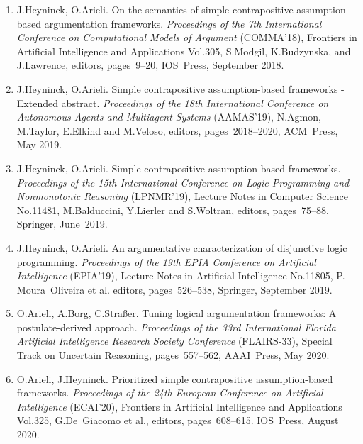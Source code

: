 \documentclass{article}
\begin{document}
\begin{enumerate}
  \item J.Heyninck, O.Arieli.
          On the semantics of simple contrapositive assumption-based argumentation frameworks.
          {\em Proceedings of the 7th International Conference on Computational Models of Argument\/} (COMMA'18),
          Frontiers in Artificial Intelligence and Applications Vol.305, S.Modgil, K.Budzynska, and J.Lawrence, editors,
          pages~9--20, IOS~Press, September 2018.

  \item J.Heyninck, O.Arieli.
          Simple contrapositive assumption-based frameworks - Extended abstract.
          {\em  Proceedings of the 18th International Conference on  Autonomous Agents and Multiagent Systems\/}
          (AAMAS'19), N.Agmon, M.Taylor, E.Elkind and M.Veloso, editors, pages~2018--2020, ACM~Press, May 2019.

  \item J.Heyninck, O.Arieli.
          Simple contrapositive assumption-based frameworks.
          {\em  Proceedings of the 15th International Conference on Logic Programming and Nonmonotonic Reasoning\/}
          (LPNMR'19), Lecture Notes in Computer Science No.11481, M.Balduccini, Y.Lierler and S.Woltran, editors,
          pages~75--88, Springer, June~2019.

  \item J.Heyninck, O.Arieli.
          An argumentative characterization of disjunctive logic programming.
          {\em  Proceedings of the 19th EPIA Conference on Artificial Intelligence\/} (EPIA'19),
          Lecture Notes in Artificial Intelligence No.11805, P. Moura~Oliveira et al. editors, pages~526--538,
          Springer, September 2019.

  \item O.Arieli, A.Borg, C.Stra{\ss}er.
           Tuning logical argumentation frameworks: A postulate-derived approach.
           {\em Proceedings of the 33rd International Florida Artificial Intelligence Research Society Conference\/}
           (FLAIRS-33), Special Track on Uncertain Reasoning, pages~557--562, AAAI~Press, May 2020.

  \item O.Arieli, J.Heyninck.
          Prioritized simple contrapositive assumption-based frameworks.
          {\em Proceedings of the 24th European Conference on Artificial Intelligence\/} (ECAI'20),
           Frontiers in Artificial Intelligence and Applications Vol.325, G.De~Giacomo et al., editors,
           pages~608--615. IOS~Press, August 2020.


\end{enumerate}
\end{document}
